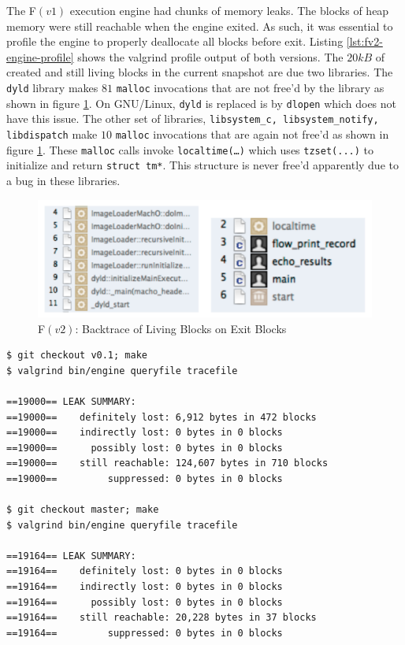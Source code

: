 The F$(v1)$ execution engine had chunks of memory leaks. The blocks of heap
memory were still reachable when the engine exited. As such, it was essential
to profile the engine to properly deallocate all blocks before exit. Listing
\ref{lst:fv2-engine-profile} shows the valgrind profile output of both
versions.  The $20kB$ of created and still living blocks in the current
snapshot are due two libraries. The \texttt{dyld} library makes $81$
\texttt{malloc} invocations that are not free'd by the library as shown in
figure \ref{fig:profile-invocations}. On GNU/Linux, \texttt{dyld} is replaced
is by \texttt{dlopen} which does not have this issue. The other set of
libraries, \texttt{libsystem\_c, libsystem\_notify, libdispatch} make $10$
\texttt{malloc} invocations that are again not free'd as shown in figure
\ref{fig:profile-invocations}.  These \texttt{malloc} calls invoke
\texttt{localtime(\ldots)} which uses \texttt{tzset(...)} to initialize and
return \texttt{struct tm*}. This structure is never free'd apparently due to
a bug in these libraries.

\begin{figure}[ht!]
\centering
\includegraphics[width=1.0\linewidth]{figures/dyld-localtime}
\caption{F$(v2)$: Backtrace of Living Blocks on Exit Blocks}
\label{fig:profile-invocations}
\end{figure}

\begin{lstlisting}
$ git checkout v0.1; make
$ valgrind bin/engine queryfile tracefile

==19000== LEAK SUMMARY:
==19000==    definitely lost: 6,912 bytes in 472 blocks
==19000==    indirectly lost: 0 bytes in 0 blocks
==19000==      possibly lost: 0 bytes in 0 blocks
==19000==    still reachable: 124,607 bytes in 710 blocks
==19000==         suppressed: 0 bytes in 0 blocks

$ git checkout master; make
$ valgrind bin/engine queryfile tracefile

==19164== LEAK SUMMARY:
==19164==    definitely lost: 0 bytes in 0 blocks
==19164==    indirectly lost: 0 bytes in 0 blocks
==19164==      possibly lost: 0 bytes in 0 blocks
==19164==    still reachable: 20,228 bytes in 37 blocks
==19164==         suppressed: 0 bytes in 0 blocks
\end{lstlisting}

